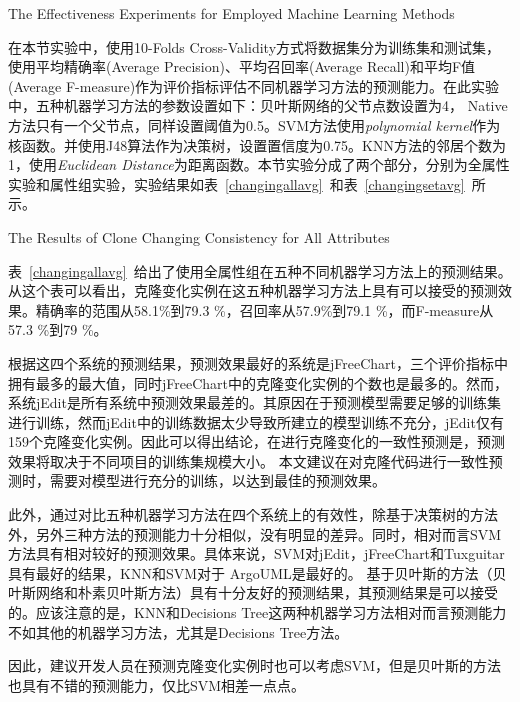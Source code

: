 {The Effectiveness Experiments for Employed Machine Learning Methods}

在本节实验中，使用10-Folds Cross-Validity方式将数据集分为训练集和测试集，使用平均精确率(Average Precision)、平均召回率(Average Recall)和平均F值(Average F-measure)作为评价指标评估不同机器学习方法的预测能力。在此实验中，五种机器学习方法的参数设置如下：贝叶斯网络的父节点数设置为4， Native方法只有一个父节点，同样设置阈值为0.5。SVM方法使用{\em polynomial kernel\/}作为核函数。并使用J48算法作为决策树，设置置信度为0.75。KNN方法的邻居个数为1，使用{\em Euclidean Distance\/}为距离函数。本节实验分成了两个部分，分别为全属性实验和属性组实验，实验结果如表~\ref{changingallavg}~和表~\ref{changingsetavg}~所示。

{The Results of Clone Changing Consistency for All Attributes}

表~\ref{changingallavg}~给出了使用全属性组在五种不同机器学习方法上的预测结果。从这个表可以看出，克隆变化实例在这五种机器学习方法上具有可以接受的预测效果。精确率的范围从58.1\%到79.3 \%，召回率从57.9\%到79.1 \%，而F-measure从57.3 \%到79 \%。

根据这四个系统的预测结果，预测效果最好的系统是jFreeChart，三个评价指标中拥有最多的最大值，同时jFreeChart中的克隆变化实例的个数也是最多的。然而，系统jEdit是所有系统中预测效果最差的。其原因在于预测模型需要足够的训练集进行训练，然而jEdit中的训练数据太少导致所建立的模型训练不充分，jEdit仅有159个克隆变化实例。因此可以得出结论，在进行克隆变化的一致性预测是，预测效果将取决于不同项目的训练集规模大小。
本文建议在对克隆代码进行一致性预测时，需要对模型进行充分的训练，以达到最佳的预测效果。

此外，通过对比五种机器学习方法在四个系统上的有效性，除基于决策树的方法外，另外三种方法的预测能力十分相似，没有明显的差异。同时，相对而言SVM方法具有相对较好的预测效果。具体来说，SVM对jEdit，jFreeChart和Tuxguitar具有最好的结果，KNN和SVM对于 ArgoUML是最好的。
基于贝叶斯的方法（贝叶斯网络和朴素贝叶斯方法）具有十分友好的预测结果，其预测结果是可以接受的。应该注意的是，KNN和Decisions Tree这两种机器学习方法相对而言预测能力不如其他的机器学习方法，尤其是Decisions Tree方法。

因此，建议开发人员在预测克隆变化实例时也可以考虑SVM，但是贝叶斯的方法也具有不错的预测能力，仅比SVM相差一点点。

